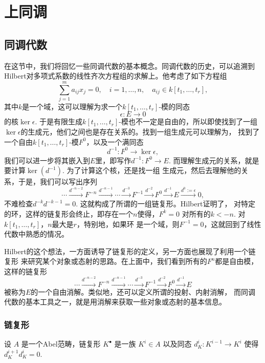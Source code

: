 \chapter{上同调}

\section{同调代数}

在这节中，我们将回忆一些同调代数的基本概念。同调代数的历史，可以追溯到
Hilbert对多项式系数的线性齐次方程组的求解上。他考虑了如下方程组
\[
    \sum_{j=1}^ma_{ij}x_j=0,\quad i=1,\dots,n,\quad 
    a_{ij}\in k[t_1,\dots,t_r],
\]
其中$k$是一个域，这可以理解为求一个$k[t_1,\dots,t_r]$-模的同态
\[
    \epsilon:E\to 0
\]
的核$\ker \epsilon$. 
于是有限生成$k[t_1,\dots,t_r]$-模也不一定是自由的，所以即使找到了一组
$\ker \epsilon$的生成元，他们之间也是存在关系的。找到一组生成元可以理解为，
找到了一个自由$k[t_1,\dots,t_r]$-模$F^0$，以及一个满同态
\[
    d^{-1}:F^0\to \ker \epsilon,
\]
我们可以进一步将其嵌入到$E$里，即写作$d^{-1}:F^0\to E$.
而理解生成元的关系，就是要计算$\ker(d^{-1})$. 为了计算这个核，还是找一组
生成元，然后去理解他的关系，于是，我们可以写出序列
\[
    \cdots\xrightarrow{d^{-n-2}}F^{-n}\xrightarrow{d^{-n-1}}\cdots \xrightarrow{d^{-3}}F^{-1}\xrightarrow{d^{-2}}F^0\xrightarrow{d^{-1}}E\xrightarrow{d^0:=\epsilon} 0,
\]
不难检查$d^{-k}d^{-k-1}=0$. 这就构成了所谓的一组链复形。Hilbert证明了，
对特定的环，这样的链复形会终止，即存在一个$n$使得，$F^{k}=0$
对所有的$k<-n$. 对$k[t_1,\dots,t_r]$，$n$最大是$r$，特别地，如果环
是一个域，则$F^{-1}=0$，这就回到了线性代数中熟悉的情况。

Hilbert的这个想法，一方面诱导了链复形的定义，另一方面也展现了利用一个链复形
来研究某个对象或态射的思路。在上面中，我们看到所有的$F^{n}$都是自由模，
这样的链复形
\[
    \cdots\xrightarrow{d^{-n-2}}F^{-n}\xrightarrow{d^{-n-1}}\cdots \xrightarrow{d^{-3}}F^{-1}\xrightarrow{d^{-2}}F^0\xrightarrow{d^{-1}}E
\]
被称为$E$的一个自由消解。类似地，还可以定义所谓的投射、内射消解，
而同调代数的基本工具之一，就是用消解来获取一些对象或态射的基本信息。

\subsection{链复形}

\begin{para}[链复形]
	设 $A$ 是一个Abel范畴，链复形 $K^\bullet$ 是一族 $K^i\in A$ 以及同态 
    $d^i_K:K^{i-1}\to K^i$ 使得 $d_K^{i+1}d_K^i=0$.
\end{para}

